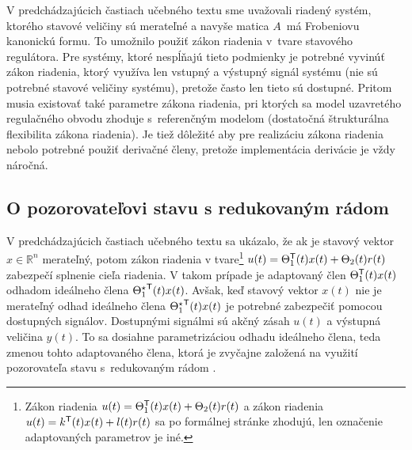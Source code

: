 \documentclass[a4paper, 10pt, ]{article}
\begin{document}
\lettrine[lines=3, nindent=0pt]{V}{} predchádzajúcich častiach učebného textu sme uvažovali riadený systém, ktorého stavové veličiny sú merateľné a navyše matica $A$~má Frobeniovu kanonickú formu. To umožnilo použiť zákon riadenia v~tvare stavového regulátora. Pre systémy, ktoré nespĺňajú tieto podmienky je potrebné vyvinúť zákon riadenia, ktorý využíva len vstupný a výstupný signál systému (nie sú potrebné stavové veličiny systému), pretože často len tieto sú dostupné. Pritom musia existovať také parametre zákona riadenia, pri ktorých sa model uzavretého regulačného obvodu zhoduje s~referenčným modelom (dostatočná štrukturálna flexibilita zákona riadenia). Je tiež dôležité aby pre realizáciu zákona riadenia nebolo potrebné použiť derivačné členy, pretože implementácia derivácie je vždy náročná.






\subsection{O pozorovateľovi stavu s redukovaným rádom}





V predchádzajúcich častiach učebného textu sa ukázalo, že ak je stavový vektor $x \in \mathbb{R}^n$ merateľný, potom zákon riadenia v tvare\footnote{Zákon riadenia $u(t) = \Theta_1^{\mathsf{T}}(t) x(t) + \Theta_2(t) r(t)$ a zákon riadenia $u(t) = k^{\mathsf{T}}(t) x(t) + l(t) r(t)$ sa po formálnej stránke zhodujú, len označenie adaptovaných parametrov je iné.} $u(t) = \Theta_1^{\mathsf{T}}(t) x(t) + \Theta_2(t) r(t)$ zabezpečí splnenie cieľa riadenia. V takom prípade je adaptovaný člen $\Theta_1^{\mathsf{T}}(t) x(t)$ odhadom ideálneho člena ${\Theta_1^\star}^{\mathsf{T}}(t) x(t)$. Avšak, keď stavový vektor $x(t)$ nie je merateľný odhad ideálneho člena ${\Theta_1^\star}^{\mathsf{T}}(t) x(t)$ je potrebné zabezpečiť pomocou dostupných signálov. Dostupnými signálmi sú akčný zásah $u(t)$ a výstupná veličina $y(t)$. To sa dosiahne parametrizáciou odhadu ideálneho člena, teda zmenou tohto adaptovaného člena, ktorá je zvyčajne založená na využití pozorovateľa stavu s~redukovaným rádom \cite{Tao03}.
\end{document}

